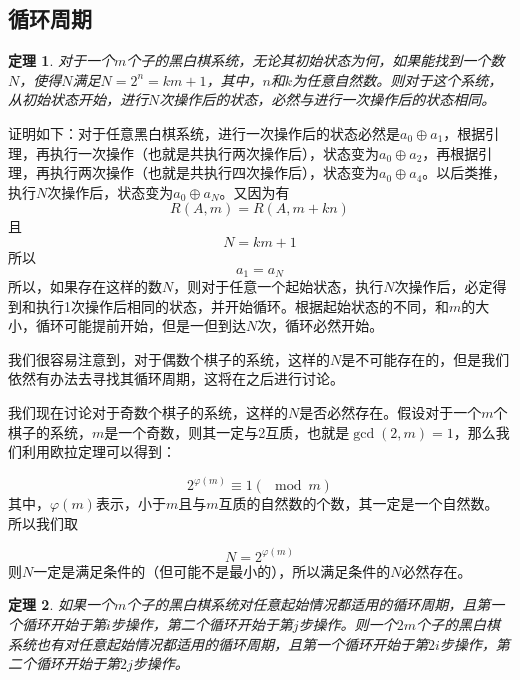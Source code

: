 \documentclass[12pt,AutoFakeSlant,AutoFakeBold]{article}
\newtheorem{theorem}{定理}
\newcommand{\nor}{\oplus}
\begin{document}
\subsection{循环周期}

\begin{theorem}
对于一个$m$个子的黑白棋系统，无论其初始状态为何，如果能找到一个数$N$，使得$N$满足$N=2^n=km+1$，其中，$n$和$k$为任意自然数。则对于这个系统，从初始状态开始，进行$N$次操作后的状态，必然与进行一次操作后的状态相同。
\end{theorem}

证明如下：对于任意黑白棋系统，进行一次操作后的状态必然是$a_0\nor a_1$，根据引理，再执行一次操作（也就是共执行两次操作后），状态变为$a_0\nor a_2$，再根据引理，再执行两次操作（也就是共执行四次操作后），状态变为$a_0\nor a_4$。以后类推，执行$N$次操作后，状态变为$a_0\nor a_N$。又因为有
\begin{equation}
    R(A,m)=R(A,m+kn)
\end{equation}
且
\begin{equation}
    N=km+1
\end{equation}
所以
\begin{equation}
    a_1=a_N
\end{equation}
所以，如果存在这样的数$N$，则对于任意一个起始状态，执行$N$次操作后，必定得到和执行1次操作后相同的状态，并开始循环。根据起始状态的不同，和$m$的大小，循环可能提前开始，但是一但到达$N$次，循环必然开始。

我们很容易注意到，对于偶数个棋子的系统，这样的$N$是不可能存在的，但是我们依然有办法去寻找其循环周期，这将在之后进行讨论。

我们现在讨论对于奇数个棋子的系统，这样的$N$是否必然存在。假设对于一个$m$个棋子的系统，$m$是一个奇数，则其一定与2互质，也就是$\gcd(2,m)=1$，那么我们利用欧拉定理可以得到：

\begin{equation}
    2^{\varphi(m)}\equiv 1(\mod m)
\end{equation}
其中，$\varphi(m)$表示，小于$m$且与$m$互质的自然数的个数，其一定是一个自然数。所以我们取

\begin{equation}
    N = 2^{\varphi(m)}
\end{equation}
则$N$一定是满足条件的（但可能不是最小的），所以满足条件的$N$必然存在。

\begin{theorem}
    如果一个$m$个子的黑白棋系统对任意起始情况都适用的循环周期，且第一个循环开始于第$i$步操作，第二个循环开始于第$j$步操作。则一个$2m$个子的黑白棋系统也有对任意起始情况都适用的循环周期，且第一个循环开始于第$2i$步操作，第二个循环开始于第$2j$步操作。
\end{theorem}
\end{document}
